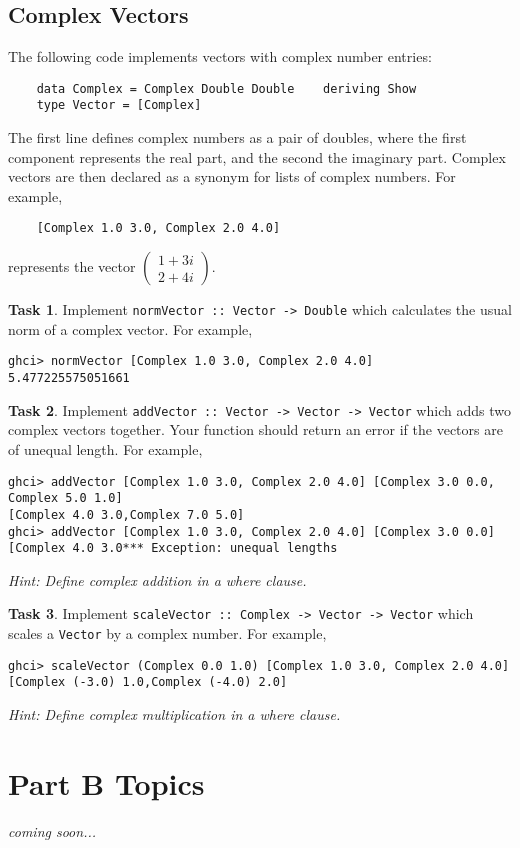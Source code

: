 \documentclass{article}[12pt]
\theoremstyle{definition}
\newtheorem{task}{Task}
\begin{document}
\subsection{Complex Vectors}
The following code implements vectors with complex number entries:
\begin{verbatim}
    data Complex = Complex Double Double    deriving Show
    type Vector = [Complex] 
\end{verbatim}
The first line defines complex numbers as a pair of doubles, where the first component represents the real part, and the second the imaginary part. Complex vectors are then declared as a synonym for lists of complex numbers. For example,
\begin{verbatim}
    [Complex 1.0 3.0, Complex 2.0 4.0]\end{verbatim}
represents the vector $\begin{pmatrix} 1+3i \\ 2 + 4i \end{pmatrix}$.

\begin{task}
    Implement \verb|normVector :: Vector -> Double| which calculates the usual norm of a complex vector.  
    For example,
    \begin{verbatim}
ghci> normVector [Complex 1.0 3.0, Complex 2.0 4.0]
5.477225575051661\end{verbatim}
\end{task}

\begin{task}
    Implement \verb|addVector :: Vector -> Vector -> Vector| which adds two complex vectors together. Your function should return an error if the vectors are of unequal length.  
    For example,
    \begin{verbatim}
ghci> addVector [Complex 1.0 3.0, Complex 2.0 4.0] [Complex 3.0 0.0, Complex 5.0 1.0]
[Complex 4.0 3.0,Complex 7.0 5.0]
ghci> addVector [Complex 1.0 3.0, Complex 2.0 4.0] [Complex 3.0 0.0]
[Complex 4.0 3.0*** Exception: unequal lengths\end{verbatim}
    \emph{Hint: Define complex addition in a where clause.}
\end{task}

\begin{task}
    Implement \verb|scaleVector :: Complex -> Vector -> Vector| which scales a \verb|Vector| by a complex number.  
    For example,
    \begin{verbatim}
ghci> scaleVector (Complex 0.0 1.0) [Complex 1.0 3.0, Complex 2.0 4.0]
[Complex (-3.0) 1.0,Complex (-4.0) 2.0]\end{verbatim}
    \emph{Hint: Define complex multiplication in a where clause.}
\end{task}

\section{Part B Topics}

\emph{coming soon...}
\end{document}
